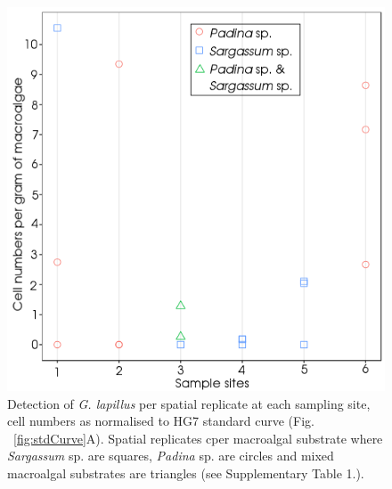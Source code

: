 \documentclass[12pt]{article}
\begin{document}
\FloatBarrier 
\begin{figure} 
\includegraphics[scale=.7]{Hero_qpcr-figs/Fig5_Env-sites-May18.png} 
\caption{Detection of \emph{G. lapillus} per spatial replicate at each sampling site, cell numbers as normalised to HG7 standard curve (Fig. ~\ref{fig:stdCurve}A). Spatial replicates cper macroalgal substrate where \emph{Sargassum} sp. are squares, \emph{Padina} sp. are circles and mixed macroalgal substrates are triangles (see Supplementary Table 1.).} 
\label{fig:envHG7}
\end{figure} 
\FloatBarrier



\newpage


\end{document}
